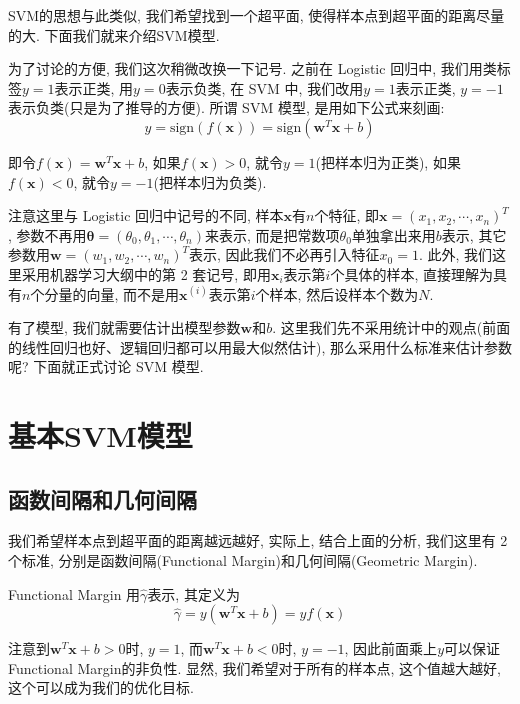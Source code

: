 \documentclass[a4paper,UTF8]{ctexart}
\theoremstyle{plain} \newtheorem{theorem}{定理}[section]
\theoremstyle{plain} \newtheorem{definition}{定义}[section]
\theoremstyle{plain} \newtheorem{lemma}{引理}[section]
\theoremstyle{plain} \newtheorem{proposition}{命题}[section]
\theoremstyle{plain} \newtheorem{example}{例}
\theoremstyle{plain} \newtheorem{remark}{注}
\theoremstyle{plain} \newtheorem{corollary}{推论}[section]
\begin{document}
SVM的思想与此类似, 我们希望找到一个超平面, 使得样本点到超平面的距离尽量的大. 下面我们就来介绍SVM模型.

为了讨论的方便, 我们这次稍微改换一下记号. 之前在 Logistic 回归中, 我们用类标签$y = 1$表示正类, 用$y = 0$表示负类, 在 SVM 中, 我们改用$y = 1$表示正类, $y = -1$表示负类(只是为了推导的方便). 所谓 SVM 模型, 是用如下公式来刻画: 
\begin{equation*}
y = \mathrm{sign} (f(\bm{x})) = \mathrm{sign}(\bm{w}^{T} \bm{x} + b) 
\end{equation*}

即令$f(\bm{x}) = \bm{w}^{T} \bm{x} + b$, 如果$f(\bm{x}) > 0$, 就令$y = 1$(把样本归为正类), 如果$f(\bm{x}) < 0$, 就令$y = -1$(把样本归为负类).

注意这里与 Logistic 回归中记号的不同, 样本$\bm{x}$有$n$个特征, 即$\bm{x} = (x_{1}, x_{2}, \cdots, x_{n})^{T}$, 参数不再用$\bm{\theta} = (\theta_0, \theta_1, \cdots, \theta_{n})$来表示, 而是把常数项$\theta_0$单独拿出来用$b$表示, 其它参数用$\bm{w} = (w_1, w_2, \cdots, w_{n})^{T}$表示, 因此我们不必再引入特征$x_{0} = 1$. 此外, 我们这里采用机器学习大纲中的第 2 套记号, 即用$\bm{x}_{i}$表示第$i$个具体的样本, 直接理解为具有$n$个分量的向量, 而不是用$\bm{x}^{(i)}$表示第$i$个样本, 然后设样本个数为$N$.

有了模型, 我们就需要估计出模型参数$\bm{w}$和$b$. 这里我们先不采用统计中的观点(前面的线性回归也好、逻辑回归都可以用最大似然估计), 那么采用什么标准来估计参数呢? 下面就正式讨论 SVM 模型.


\section{基本SVM模型}
\subsection{函数间隔和几何间隔}
我们希望样本点到超平面的距离越远越好, 实际上, 结合上面的分析, 我们这里有 2 个标准, 分别是函数间隔(Functional Margin)和几何间隔(Geometric Margin).

Functional Margin 用$\hat{\gamma}$表示, 其定义为
\begin{equation*}
\hat{\gamma}  = y (\bm{w}^{T} \bm{x} + b) = y f(\bm{x})
\end{equation*}

注意到$\bm{w}^{T} \bm{x} + b > 0$时, $y = 1$, 而$\bm{w}^{T} \bm{x} + b < 0$时, $y = -1$, 因此前面乘上$y$可以保证Functional Margin的非负性. 显然, 我们希望对于所有的样本点, 这个值越大越好, 这个可以成为我们的优化目标.
\end{document}
